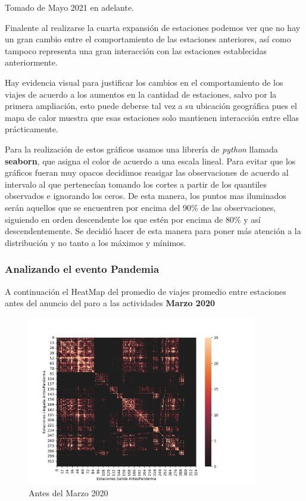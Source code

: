 \documentclass[
]{article}
\begin{document}
Tomado de Mayo 2021 en adelante.

Finalente al realizarse la cuarta expansión de estaciones podemos ver
que no hay un gran cambio entre el comportamiento de las estaciones
anteriores, así como tampoco representa una gran interacción con las
estaciones establecidas anteriormente.

Hay evidencia visual para justificar los cambios en el comportamiento de
los viajes de acuerdo a los aumentos en la cantidad de estaciones, salvo
por la primera ampliación, esto puede deberse tal vez a su ubicación
geográfica pues el mapa de calor muestra que esas estaciones solo
mantienen interacción entre ellas prácticamente.

Para la realización de estos gráficos usamos una librería de
\emph{python} llamada \textbf{seaborn}, que asigna el color de acuerdo a
una escala lineal. Para evitar que los gráficos fueran muy opacos
decidimos reasigar las observaciones de acuerdo al intervalo al que
pertenecían tomando los cortes a partir de los quantiles observados e
ignorando los ceros. De esta manera, los puntos mas iluminados serán
aquellos que se encuentren por encima del 90\% de las observaciones,
siguiendo en orden descendente los que estén por encima de 80\% y así
descendentemente. Se decidió hacer de esta manera para poner más
atención a la distribución y no tanto a los máximos y mínimos.

\newpage
\hypertarget{analizando-el-evento-pandemia}{%
\subsubsection{Analizando el evento
Pandemia}\label{analizando-el-evento-pandemia}}

A continuación el HeatMap del promedio de viajes promedio entre
estaciones antes del anuncio del paro a las actividades \textbf{Marzo
2020}

\begin{figure}
\centering
\includegraphics[width=10cm]{../plots/resultsAntesPandemia.png}
\caption{Antes del Marzo 2020}
\end{figure}
\end{document}
